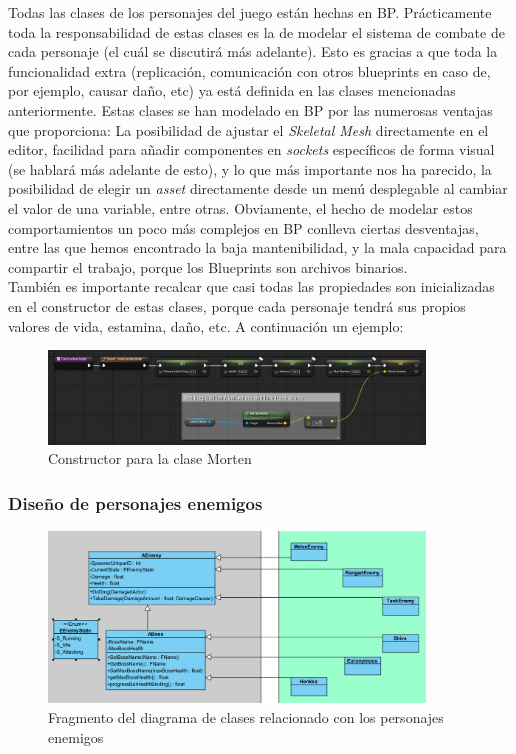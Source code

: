 Todas las clases de los personajes del juego están hechas en \ac{BP}. Prácticamente toda la responsabilidad de estas clases es la de modelar el sistema de combate de cada personaje (el cuál se discutirá más adelante). Esto es gracias a que toda la funcionalidad extra (replicación, comunicación con otros blueprints en caso de, por ejemplo, causar daño, etc) ya está definida en las clases mencionadas anteriormente. Estas clases se han modelado en \ac{BP} por las numerosas ventajas que proporciona: La posibilidad de ajustar el \textit{Skeletal Mesh} directamente en el editor, facilidad para añadir componentes en \textit{sockets} específicos de forma visual (se hablará más adelante de esto), y lo que más importante nos ha parecido, la posibilidad de elegir un \textit{asset} directamente desde un menú desplegable al cambiar el valor de una variable, entre otras. Obviamente, el hecho de modelar estos comportamientos un poco más complejos en \ac{BP} conlleva ciertas desventajas, entre las que hemos encontrado la baja mantenibilidad, y la mala capacidad para compartir el trabajo, porque los Blueprints son archivos binarios.
\\

También es importante recalcar que casi todas las propiedades son inicializadas en el constructor de estas clases, porque cada personaje tendrá sus propios valores de vida, estamina, daño, etc. A continuación un ejemplo:

\begin{figure}[H]
  \centering
  \includegraphics[width=10cm]{./images/BP_Morten_Constructor.png}
  \caption{Constructor para la clase Morten}
  \label{MortenConstructor}
\end{figure}


\subsubsection{Diseño de personajes enemigos}

\begin{figure}[H]
  \centering
  \includegraphics[width=10cm]{./images/Classes_Enemigos.png}
  \caption{Fragmento del diagrama de clases relacionado con los personajes enemigos}
  \label{ClassesEnemies}
\end{figure}

